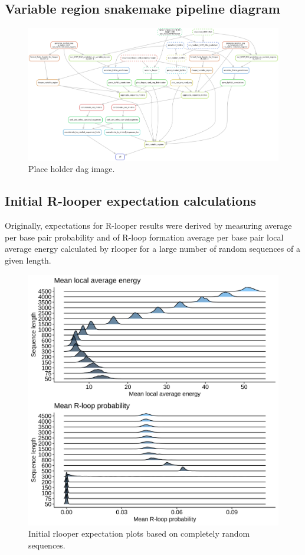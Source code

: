 \documentclass[11pt]{article}
\begin{document}
\subsection{Variable region snakemake pipeline diagram}

\begin{figure}[H]
	\includegraphics[width=15cm]{images/misc/dag.png}
	\centering
	\caption{Place holder dag image.}
\end{figure}

\subsection{Initial R-looper expectation calculations}

Originally, expectations for R-looper results were derived by measuring average per base pair probability and of R-loop formation average per base pair local average energy calculated by rlooper for a large number of random sequences of a given length. 

\begin{figure}[H]
	\includegraphics[width=15cm]{images/plots/rand_seq_LAE_dist.png}
	\centering
	\caption{Initial rlooper expectation plots based on completely random sequences.}
\end{figure}
\end{document}
